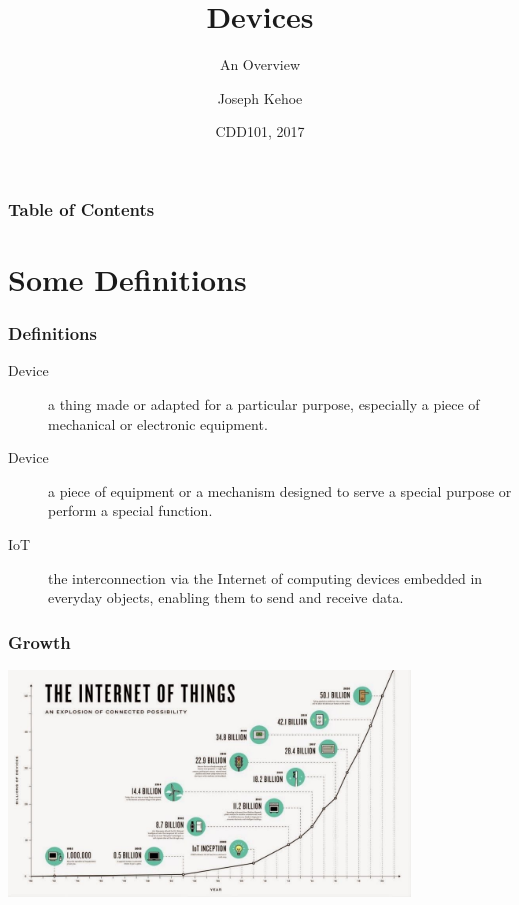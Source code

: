\documentclass{beamer}
\title[Overview] %
{Devices}
\subtitle{An Overview}
\author[Dr. Joseph Kehoe] %
{Joseph Kehoe\inst{1}}
\institute[IT Carlow] %
{
	\inst{1}%
	Department of Computing and Networking\\
	Institute of Technology Carlow
}
\date[ITC 2017] %
{CDD101, 2017}
\begin{document}
 
\frame{\titlepage}
 
 
 
 \begin{frame}
 	\frametitle{Table of Contents}
 	\tableofcontents
 \end{frame}
 
 
 \section{Some Definitions}
\begin{frame}
\frametitle{Definitions}
\begin{description}
	\item[Device] a thing made or adapted for a particular purpose, especially a piece of mechanical or electronic equipment.
	\item[Device] a piece of equipment or a mechanism designed to serve a special purpose or perform a special function.
	\item[IoT] the interconnection via the Internet of computing devices embedded in everyday objects, enabling them to send and receive data.
\end{description}

\end{frame}

\begin{frame}
	\frametitle{Growth}
\includegraphics[height=6cm]{growth.jpg}
	
\end{frame}
\end{document}
